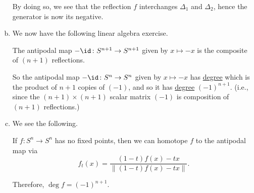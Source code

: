 \begin{remark}
\begin{enumerate}[(a)]
\begin{answer}
			      By doing so, we see that the reflection \(f\) interchanges \(\Delta _1\) and \(\Delta _2\), hence the generator is now its negative.
		      \end{answer}
		\item We now have the following linear algebra exercise.
		      \begin{exercise}
			      The antipodal map \(-\id_{}\colon S^{n + 1} \to S^{n + 1}\) given by \(x \mapsto -x\) is the composite of
			      \((n + 1)\) reflections.
		      \end{exercise}
		      So the antipodal map \(-\id_{}\colon S^n \to S^n\) given by \(x \mapsto -x\) has \hyperref[def:degree]{degree} which is the product of \(n + 1\) copies of \((-1)\), and so it has \hyperref[def:degree]{degree} \((-1)^{n + 1}\). (i.e., since the \((n+1)\times (n+1)\) scalar matrix \((-1)\) is composition of \((n+1)\) reflections.)
		\item We see the following.
		      \begin{exercise}
			      If \(f\colon S^n \to S^n\) has no fixed points, then we can homotope \(f\) to the antipodal map via
			      \[
				      f_t(x) = \frac{(1 - t)f(x) - tx}{\left\lVert (1 - t)f(x) - tx\right\rVert}.
			      \]
		      \end{exercise}
		      Therefore, \(\deg f = (-1)^{n + 1}\).
	\end{enumerate}
\end{remark}